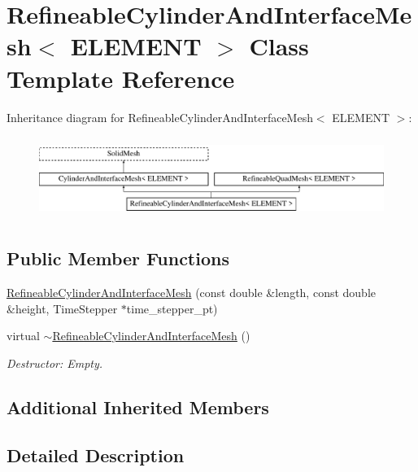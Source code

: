 \hypertarget{classRefineableCylinderAndInterfaceMesh}{}\section{Refineable\+Cylinder\+And\+Interface\+Mesh$<$ E\+L\+E\+M\+E\+NT $>$ Class Template Reference}
\label{classRefineableCylinderAndInterfaceMesh}
Inheritance diagram for Refineable\+Cylinder\+And\+Interface\+Mesh$<$ E\+L\+E\+M\+E\+NT $>$\+:\begin{figure}[H]
\begin{center}
\leavevmode
\includegraphics[height=2.675159cm]{classRefineableCylinderAndInterfaceMesh}
\end{center}
\end{figure}
\subsection*{Public Member Functions}
\begin{DoxyCompactItemize}
\item 
\hyperlink{classRefineableCylinderAndInterfaceMesh_a2f42954cee8f7ba47d87f842dbdc4cc2}{Refineable\+Cylinder\+And\+Interface\+Mesh} (const double \&length, const double \&height, Time\+Stepper $\ast$time\+\_\+stepper\+\_\+pt)
\item 
virtual \hyperlink{classRefineableCylinderAndInterfaceMesh_ad661ea3bc9100aaac36bc10aab9b2648}{$\sim$\+Refineable\+Cylinder\+And\+Interface\+Mesh} ()
\begin{DoxyCompactList}\small\item\em Destructor\+: Empty. \end{DoxyCompactList}\end{DoxyCompactItemize}
\subsection*{Additional Inherited Members}


\subsection{Detailed Description}
